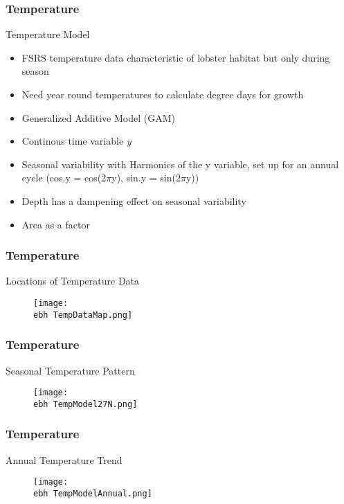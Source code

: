 \documentclass{beamer}
\newcommand{\ebh}{\string~/bio.data/bio.lobster/figures/LFA2733Framework2018/} %
\begin{document}
\begin{frame}
\frametitle{Temperature}
Temperature Model
\begin{itemize}
\item FSRS temperature data characteristic of lobster habitat but only during season
\item Need year round temperatures to calculate degree days for growth
\item Generalized Additive Model (GAM)
\item Continous time variable \textit{y}
\item Seasonal variability with Harmonics of the y variable, set up for an annual cycle (cos.y = cos(2$\pi$y), sin.y = sin(2$\pi$y))
\item Depth has a dampening effect on seasonal variability
\item Area as a factor
\end{itemize}
\end{frame}


\begin{frame}
\frametitle{Temperature}
Locations of Temperature Data
\begin{figure}
        \begin{center}
            \texttt{[image: \\ebh TempDataMap.png]}
        \end{center}
    \end{figure}
\end{frame}

\begin{frame}
\frametitle{Temperature}
Seasonal Temperature Pattern
\begin{figure}
        \begin{center}
            \texttt{[image: \\ebh TempModel27N.png]}
        \end{center}
    \end{figure}
\end{frame}

\begin{frame}
\frametitle{Temperature}
Annual Temperature Trend
\begin{figure}
        \begin{center}
            \texttt{[image: \\ebh TempModelAnnual.png]}
        \end{center}
    \end{figure}
\end{frame}
\end{document}
